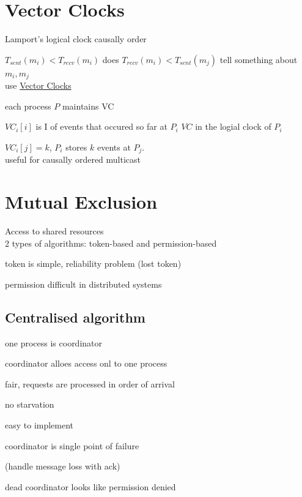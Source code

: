 \documentclass[ngerman,a4paper]{report}
\begin{document}
\chapter{Vector Clocks}
\begin{compactitem}
	\item Lamport's logical clock causally order
	\item $T_{sent}(m_i) < T_{recv} (m_i)$
		does $T_{recv} (m_i) < T_{sent} (m_j)$
		tell something about $m_i,m_j$\\
		use \underline{Vector Clocks}
	\item each process $P$ maintains VC
		\begin{compactenum}
			\item $VC_i[i]$ is I of events that occured so far at $P_i$
				$VC$ in the logial clock of $P_i$
			\item $VC_i[j]=k$, $P_i$ stores $k$ events at $P_j$.\\
				useful for causally ordered multicast\\
		\end{compactenum}
\end{compactitem}


\chapter{Mutual Exclusion}
Access to shared resources\\
2 types of algorithms: token-based and permission-based
\begin{compactitem}
	\item token is simple, reliability problem (lost token)
	\item permission difficult in distributed systems
\end{compactitem}

\section{Centralised algorithm}
\begin{compactitem}
	\item one process is coordinator
	\item coordinator alloes access onl to one process
	\item fair, requests are processed in order of arrival
	\item no starvation
	\item easy to implement
	\item coordinator is single point of failure
	\item (handle message loss with ack)
	\item dead coordinator looks like permission denied
\end{compactitem}
\end{document}
